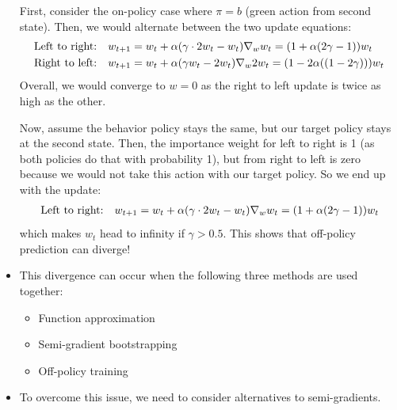 \begin{itemize}
	First, consider the on-policy case where $\pi=b$ (green action from second state). Then, we would alternate between the two update equations:
	\begin{equation*}
		\begin{split}
		\text{Left to right: }\hspace{2mm}w_{t+1} & = w_t + \alpha (\gamma \cdot 2w_t-w_t)\nabla_w w_t = (1+\alpha(2\gamma-1)) w_t\\
		\text{Right to left: }\hspace{2mm}w_{t+1} & = w_t + \alpha (\gamma w_t-2w_t)\nabla_w 2w_t = (1-2\alpha((1-2\gamma))) w_t\\
		\end{split}
	\end{equation*}
	Overall, we would converge to $w=0$ as the right to left update is twice as high as the other.
	
	Now, assume the behavior policy stays the same, but our target policy stays at the second state. Then, the importance weight for left to right is 1 (as both policies do that with probability 1), but from right to left is zero because we would not take this action with our target policy. So we end up with the update:
	\begin{equation*}
		\begin{split}
			\text{Left to right: }\hspace{2mm}w_{t+1} & = w_t + \alpha (\gamma \cdot 2w_t-w_t)\nabla_w w_t = (1+\alpha(2\gamma-1)) w_t\\
		\end{split}
	\end{equation*}
	which makes $w_t$ head to infinity if $\gamma>0.5$. This shows that off-policy prediction can diverge!
	
	\item This divergence can occur when the following three methods are used together:
	\begin{itemize}
		\item Function approximation
		\item Semi-gradient bootstrapping
		\item Off-policy training
	\end{itemize}
	\item To overcome this issue, we need to consider alternatives to semi-gradients.
	
\end{itemize}
